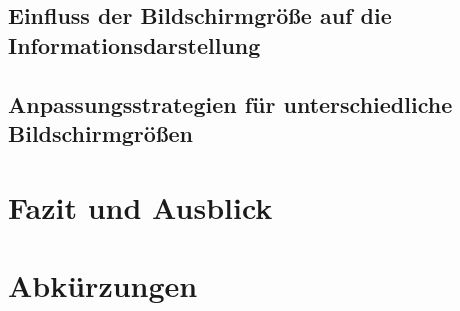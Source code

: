 \documentclass[conference,compsoc,final,a4paper]{IEEEtran}
\begin{document}
    \subsection{Einfluss der Bildschirmgröße auf die Informationsdarstellung}

    \subsection{Anpassungsstrategien für unterschiedliche Bildschirmgrößen}




    \section{Fazit und Ausblick}


    \section*{Abkürzungen}

    \begin{acronym}[IEEE]
    \end{acronym}

    \AtNextBibliography{\small}
    \printbibliography
\end{document}
